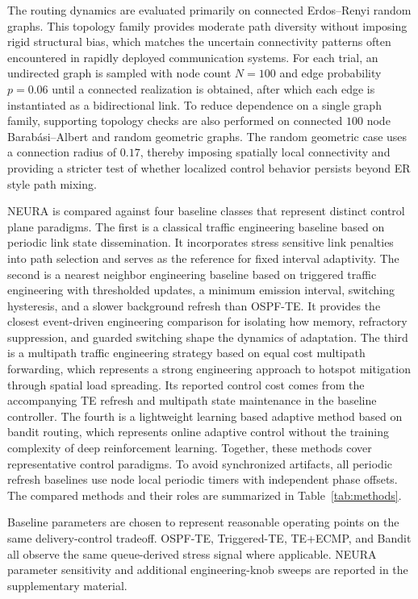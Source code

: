 \documentclass[5p,times]{elsarticle}
\begin{document}
The routing dynamics are evaluated primarily on connected Erdos--Renyi random graphs. This topology family provides moderate path diversity without imposing rigid structural bias, which matches the uncertain connectivity patterns often encountered in rapidly deployed communication systems. For each trial, an undirected graph is sampled with node count $N=100$ and edge probability $p=0.06$ until a connected realization is obtained, after which each edge is instantiated as a bidirectional link. To reduce dependence on a single graph family, supporting topology checks are also performed on connected $100$ node Barab\'asi--Albert and random geometric graphs. The random geometric case uses a connection radius of $0.17$, thereby imposing spatially local connectivity and providing a stricter test of whether localized control behavior persists beyond ER style path mixing.

NEURA is compared against four baseline classes that represent distinct control plane paradigms. The first is a classical traffic engineering baseline based on periodic link state dissemination. It incorporates stress sensitive link penalties into path selection and serves as the reference for fixed interval adaptivity. The second is a nearest neighbor engineering baseline based on triggered traffic engineering with thresholded updates, a minimum emission interval, switching hysteresis, and a slower background refresh than OSPF-TE. It provides the closest event-driven engineering comparison for isolating how memory, refractory suppression, and guarded switching shape the dynamics of adaptation. The third is a multipath traffic engineering strategy based on equal cost multipath forwarding, which represents a strong engineering approach to hotspot mitigation through spatial load spreading. Its reported control cost comes from the accompanying TE refresh and multipath state maintenance in the baseline controller. The fourth is a lightweight learning based adaptive method based on bandit routing, which represents online adaptive control without the training complexity of deep reinforcement learning. Together, these methods cover representative control paradigms. To avoid synchronized artifacts, all periodic refresh baselines use node local periodic timers with independent phase offsets. The compared methods and their roles are summarized in Table~\ref{tab:methods}.

Baseline parameters are chosen to represent reasonable operating points on the same delivery-control tradeoff. OSPF-TE, Triggered-TE, TE+ECMP, and Bandit all observe the same queue-derived stress signal where applicable. NEURA parameter sensitivity and additional engineering-knob sweeps are reported in the supplementary material.
\end{document}
